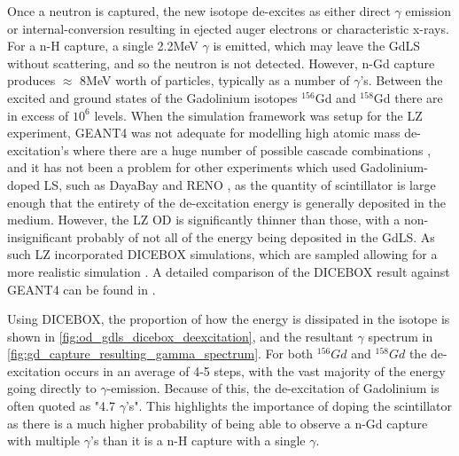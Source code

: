 \par
Once a neutron is captured, the new isotope de-excites as either direct $\gamma$ emission or internal-conversion resulting in ejected auger electrons or characteristic x-rays.
For a n-H capture, a single 2.2MeV $\gamma$ is emitted, which may leave the GdLS without scattering, and so the neutron is not detected.
However, n-Gd capture produces $\approx$ 8MeV worth of particles, typically as a number of $\gamma$'s.
Between the excited and ground states of the Gadolinium isotopes ${}^{156}$Gd and ${}^{158}$Gd there are in excess of $10^{6}$ levels.
When the simulation framework was setup for the LZ experiment, GEANT4 was not adequate for modelling high atomic mass de-excitation's where there are a huge number of possible cascade combinations \cite{ucsb_gdls_dicebox_simulations_ref}, and it has not been a problem for other experiments which used Gadolinium-doped LS, such as DayaBay \cite{dayabay_overview_ref} and RENO \cite{reno_overview_ref}, as the quantity of scintillator is large enough that the entirety of the de-excitation energy is generally deposited in the medium.
However, the LZ OD is significantly thinner than those, with a non-insignificant probably of not all of the energy being deposited in the GdLS.
As such LZ incorporated DICEBOX \cite{dicebox_simulations_ref} simulations, which are sampled allowing for a more realistic simulation \cite{lz_simulations_ref}.
A detailed comparison of the DICEBOX result against GEANT4 can be found in \cite{ucsb_gdls_dicebox_simulations_ref}.


\par
Using DICEBOX, the proportion of how the energy is dissipated in the isotope is shown in \autoref{fig:od_gdls_dicebox_deexcitation}, and the resultant $\gamma$ spectrum in \autoref{fig:gd_capture_resulting_gamma_spectrum}.
For both ${}^{156}Gd$ and ${}^{158}Gd$ the de-excitation occurs in an average of 4-5 steps, with the vast majority of the energy going directly to $\gamma$-emission.
Because of this, the de-excitation of Gadolinium is often quoted as "4.7 $\gamma$'s".
This highlights the importance of doping the scintillator as there is a much higher probability of being able to observe a n-Gd capture with multiple $\gamma$'s than it is a n-H capture with a single $\gamma$.



